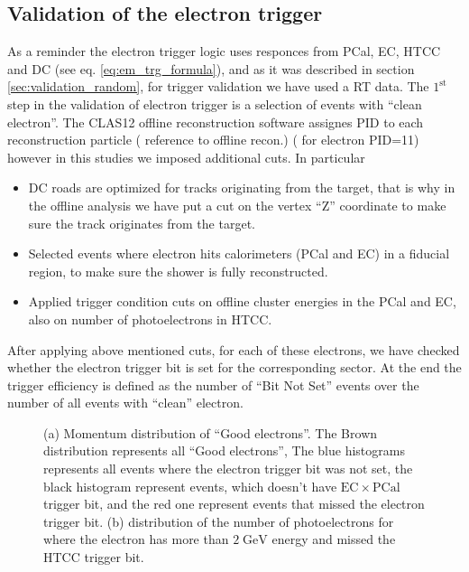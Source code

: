 \subsection{Validation of the electron trigger}
As a reminder the electron trigger logic uses responces from PCal, EC, HTCC and DC (see eq. \ref{eq:em_trg_formula}), and as it was described in section \ref{sec:validation_random}, for trigger validation we have used a RT data. 
The $\mathrm{1^{st}}$ step in the validation of electron trigger is a selection of  events with ``clean electron''. The CLAS12 offline reconstruction software assignes PID to each reconstruction particle ({\color{Red} reference to offline recon.}) ( for electron PID=11) however in this studies we imposed additional cuts. 
In particular 
\begin{itemize}
 \item DC roads are optimized for tracks originating from the target, that is why in the offline analysis we have put a cut on the vertex ``Z'' coordinate to make sure the track originates from the target.
 \item Selected events where electron hits calorimeters (PCal and EC) in a fiducial region, to make sure the shower is fully reconstructed.
 \item Applied trigger condition cuts on offline cluster energies in the PCal and EC, also on number of photoelectrons in HTCC.
\end{itemize}
After applying above mentioned cuts, for each of these electrons, we have checked whether the electron trigger bit is set for the corresponding sector. At the end the trigger efficiency is defined as the number of ``Bit Not Set'' events over the number of all events with ``clean'' electron.

\begin{figure}[!htb]
 \centering
 \caption{(a) Momentum distribution of ``Good electrons''. The Brown distribution represents all ``Good electrons'', The blue histograms represents all events where the electron trigger bit was not set, the black histogram represent events, which doesn't have $\mathrm{EC}\times \mathrm{PCal}$ trigger bit, and the red one represent events that missed the electron trigger bit. (b) distribution of the number of photoelectrons for where the electron has more than $\mathrm{2\;GeV}$ energy and missed the HTCC trigger bit.}
\end{figure}
